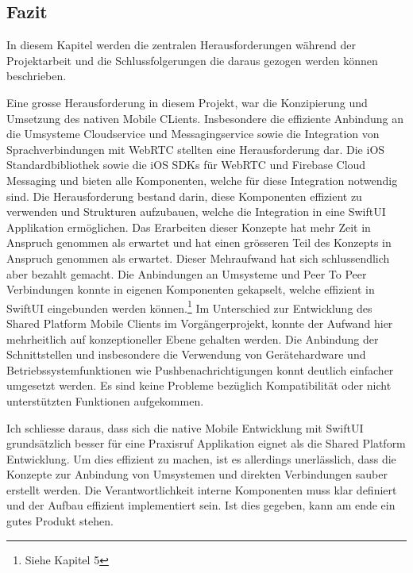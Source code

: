 \subsection{Fazit}

In diesem Kapitel werden die zentralen Herausforderungen während der Projektarbeit und die Schlussfolgerungen die daraus gezogen werden können beschrieben.

Eine grosse Herausforderung in diesem Projekt, war die Konzipierung und Umsetzung des nativen Mobile CLients.
Insbesondere die effiziente Anbindung an die Umsysteme Cloudservice und Messagingservice sowie die Integration von Sprachverbindungen mit WebRTC stellten eine Herausforderung dar.
Die iOS Standardbibliothek sowie die iOS SDKs für WebRTC und Firebase Cloud Messaging und bieten alle Komponenten, welche für diese Integration notwendig sind.
Die Herausforderung bestand darin, diese Komponenten effizient zu verwenden und Strukturen aufzubauen, welche die Integration in eine SwiftUI Applikation ermöglichen.
Das Erarbeiten dieser Konzepte hat mehr Zeit in Anspruch genommen als erwartet und hat einen grösseren Teil des Konzepts in Anspruch genommen als erwartet.
Dieser Mehraufwand hat sich schlussendlich aber bezahlt gemacht.
Die Anbindungen an Umsysteme und Peer To Peer Verbindungen konnte in eigenen Komponenten gekapselt, welche effizient in SwiftUI eingebunden werden können.\footnote{Siehe Kapitel 5}
Im Unterschied zur Entwicklung des Shared Platform Mobile Clients im Vorgängerprojekt, konnte der Aufwand hier mehrheitlich auf konzeptioneller Ebene gehalten werden.
Die Anbindung der Schnittstellen und insbesondere die Verwendung von Gerätehardware und Betriebssystemfunktionen wie Pushbenachrichtigungen konnt deutlich einfacher umgesetzt werden.
Es sind keine Probleme bezüglich Kompatibilität oder nicht unterstützten Funktionen aufgekommen.

Ich schliesse daraus, dass sich die native Mobile Entwicklung mit SwiftUI grundsätzlich besser für eine Praxisruf Applikation eignet als die Shared Platform Entwicklung.
Um dies effizient zu machen, ist es allerdings unerlässlich, dass die Konzepte zur Anbindung von Umsystemen und direkten Verbindungen sauber erstellt werden.
Die Verantwortlichkeit interne Komponenten muss klar definiert und der Aufbau effizient implementiert sein.
Ist dies gegeben, kann am ende ein gutes Produkt stehen.


